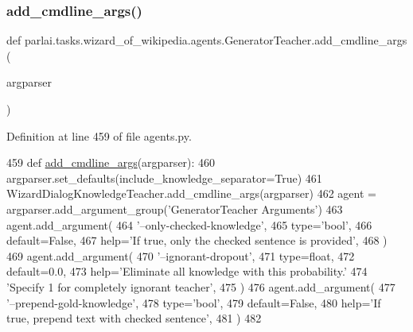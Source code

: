 \subsubsection{\texorpdfstring{add\+\_\+cmdline\+\_\+args()}{add\_cmdline\_args()}}
{\footnotesize\ttfamily def parlai.\+tasks.\+wizard\+\_\+of\+\_\+wikipedia.\+agents.\+Generator\+Teacher.\+add\+\_\+cmdline\+\_\+args (\begin{DoxyParamCaption}\item[{}]{argparser }\end{DoxyParamCaption})\hspace{0.3cm}{\ttfamily [static]}}



Definition at line 459 of file agents.\+py.


\begin{DoxyCode}
459     \textcolor{keyword}{def }\hyperlink{namespaceparlai_1_1agents_1_1drqa_1_1config_a62fdd5554f1da6be0cba185271058320}{add\_cmdline\_args}(argparser):
460         argparser.set\_defaults(include\_knowledge\_separator=\textcolor{keyword}{True})
461         WizardDialogKnowledgeTeacher.add\_cmdline\_args(argparser)
462         agent = argparser.add\_argument\_group(\textcolor{stringliteral}{'GeneratorTeacher Arguments'})
463         agent.add\_argument(
464             \textcolor{stringliteral}{'--only-checked-knowledge'},
465             type=\textcolor{stringliteral}{'bool'},
466             default=\textcolor{keyword}{False},
467             help=\textcolor{stringliteral}{'If true, only the checked sentence is provided'},
468         )
469         agent.add\_argument(
470             \textcolor{stringliteral}{'--ignorant-dropout'},
471             type=float,
472             default=0.0,
473             help=\textcolor{stringliteral}{'Eliminate all knowledge with this probability.'}
474             \textcolor{stringliteral}{'Specify 1 for completely ignorant teacher'},
475         )
476         agent.add\_argument(
477             \textcolor{stringliteral}{'--prepend-gold-knowledge'},
478             type=\textcolor{stringliteral}{'bool'},
479             default=\textcolor{keyword}{False},
480             help=\textcolor{stringliteral}{'If true, prepend text with checked sentence'},
481         )
482 
\end{DoxyCode}
\mbox{\label{classparlai_1_1tasks_1_1wizard__of__wikipedia_1_1agents_1_1GeneratorTeacher_abf361a076410dda7b42127be420611d9}} 
